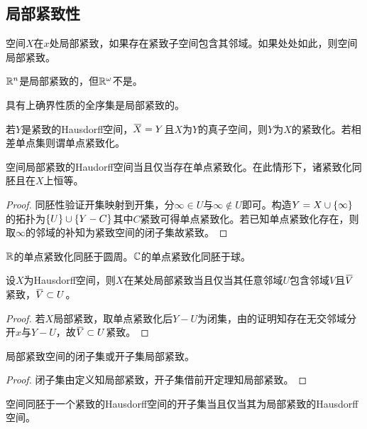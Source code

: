 \documentclass{ctexrep}
\begin{document}
  \subsection{局部紧致性}
  \begin{definition}
    空间$X$在$x$处局部紧致，如果存在紧致子空间包含其邻域。如果处处如此，则空间局部紧致。
  \end{definition}
  \begin{ex}
    $\mathbb{R}^n$是局部紧致的，但$\mathbb{R}^\omega$不是。
  \end{ex}
  \begin{ex}
    具有上确界性质的全序集是局部紧致的。
  \end{ex}
  \begin{definition}
    若$Y$是紧致的Hausdorff空间，$\clo{X}=Y$且$X$为$Y$的真子空间，则$Y$为$X$的紧致化。若相差单点集则谓单点紧致化。
  \end{definition}
  \begin{theorem}
    空间局部紧致的Haudorff空间当且仅当存在单点紧致化。在此情形下，诸紧致化同胚且在$X$上恒等。 
  \end{theorem}
  \begin{proof}
    同胚性验证开集映射到开集，分$\infty\in U$与$\infty \notin U$即可。构造$Y=X\cup\left\{\infty\right\}$的拓扑为$\left\{U\right\}\cup\left\{Y-C\right\}$其中$C$紧致可得单点紧致化。若已知单点紧致化存在，则取$\infty$的邻域的补知为紧致空间的闭子集故紧致。
  \end{proof}
  \begin{ex}
    $\mathbb{R}$的单点紧致化同胚于圆周。$\mathbb{C}$的单点紧致化同胚于球。
  \end{ex}
  \begin{theorem}
    设$X$为Hausdorff空间，则$X$在某处局部紧致当且仅当其任意邻域$U$包含邻域$V$且$\clo{V}$紧致，$\clo{V}\subset U$。
  \end{theorem}
  \begin{proof}
    若$X$局部紧致，取单点紧致化后$Y-U$为闭集，由的证明知存在无交邻域分开$x$与$Y-U$，故$\clo{V}\subset U$紧致。
  \end{proof}
  \begin{corollary}
    局部紧致空间的闭子集或开子集局部紧致。
  \end{corollary}
  \begin{proof}
    闭子集由定义知局部紧致，开子集借前开定理知局部紧致。
  \end{proof}
  \begin{corollary}
    空间同胚于一个紧致的Hausdorff空间的开子集当且仅当其为局部紧致的Hausdorff空间。
  \end{corollary}
\end{document}
